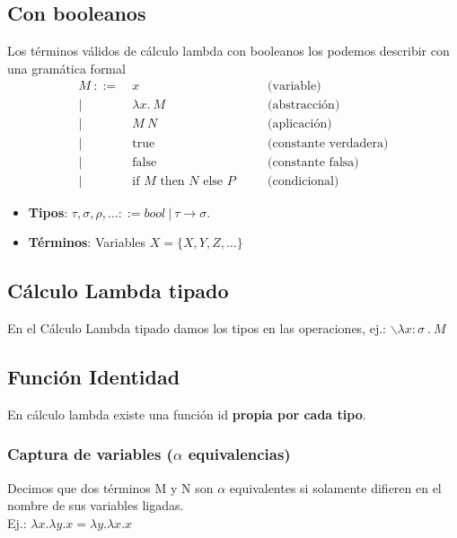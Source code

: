 \documentclass[10pt,a4paper]{article}
\begin{document}
\subsection*{Con booleanos}
Los términos válidos de cálculo lambda con booleanos los podemos describir con una gramática formal 
\[
\begin{aligned}
M \ ::= \ & x \quad &&\text{(variable)} \\
       | \ & \lambda x .\ M \quad &&\text{(abstracción)} \\
       | \ & M\ N \quad &&\text{(aplicación)} \\
       | \ & \text{true} \quad &&\text{(constante verdadera)} \\
       | \ & \text{false} \quad &&\text{(constante falsa)} \\
       | \ & \text{if } M \text{ then } N \text{ else } P \quad &&\text{(condicional)}
\end{aligned}
\]
\begin{itemize}
    \item \textbf{Tipos}: $\tau, \sigma, \rho, \dots ::= bool \ | \ \tau \rightarrow \sigma$. 
    \item \textbf{Términos}: Variables $X = \{X, Y, Z, \dots\}$
\end{itemize}
\subsection*{Cálculo Lambda tipado}
En el Cálculo Lambda tipado damos los tipos en las operaciones, ej.: $\backslash \lambda x:\sigma \ . \ M$
\subsection*{Función Identidad}
En cálculo lambda existe una función id \textbf{propia por cada tipo}.
\subsubsection*{Captura de variables ($\alpha$ equivalencias)}
Decimos que dos términos M y N son $\alpha$ equivalentes si solamente difieren en el nombre de sus variables ligadas.\\
Ej.: $\lambda x.\lambda y.x = \lambda y.\lambda x.x$
\end{document}
